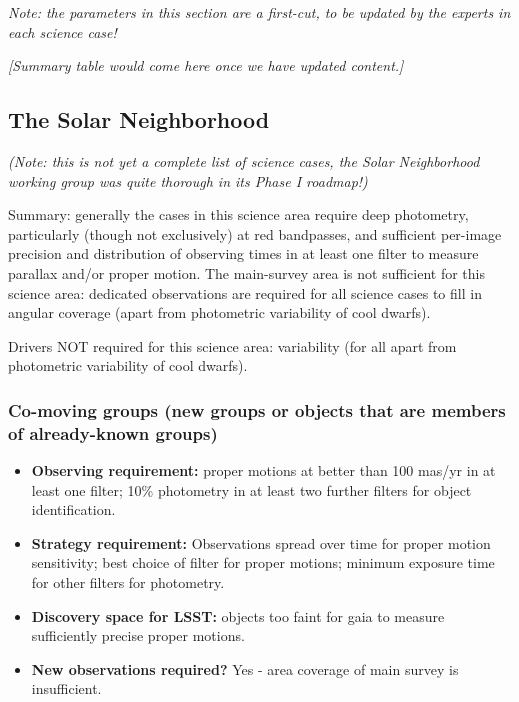 {\it Note: the parameters in this section are a first-cut, to be
  updated by the experts in each science case!}

{\it [Summary table would come here once we have updated content.]}

\subsection{The Solar Neighborhood}

{\it (Note: this is not yet a complete list of science cases, the
  Solar Neighborhood working group was quite thorough in its Phase I
  roadmap!)}

Summary: generally the cases in this science area require deep
photometry, particularly (though not exclusively) at red bandpasses,
and sufficient per-image precision and distribution of observing times
in at least one filter to measure parallax and/or proper motion. The
main-survey area is not sufficient for this science area: dedicated
observations are required for all science cases to fill in angular
coverage (apart from photometric variability of cool dwarfs).

Drivers NOT required for this science area: variability (for all apart from photometric variability of cool dwarfs).
\vspace{-2mm}

\subsubsection{Co-moving groups (new groups or objects that are members of already-known groups)}
\vspace{-2mm}
\begin{itemize}
\item {\bf Observing requirement:}  proper motions at better than 100 mas/yr in at least one filter; 10\% photometry in at least two further filters for object identification.
\vspace{-2mm}

\item {\bf Strategy requirement:} Observations spread over time for proper motion sensitivity; best choice of filter for proper motions; minimum exposure time for other filters for photometry.
\vspace{-2mm}

\item {\bf Discovery space for LSST:} objects too faint for gaia to measure sufficiently precise proper motions.
\vspace{-2mm}

\item {\bf New observations required?} Yes - area coverage of main survey is insufficient.
\vspace{-2mm}
\end{itemize}

